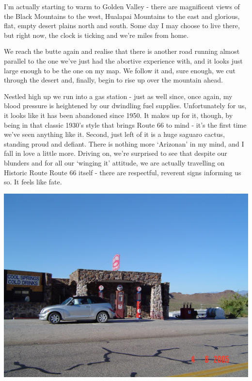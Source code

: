 \documentclass[a5paper,titlepage,11pt]{book}
\begin{document}
I'm actually starting to warm to Golden Valley - there are magnificent views of the Black Mountains to the west, Hualapai Mountains to the east and glorious, flat, empty desert plains north and south.  Some day I may choose to live there, but right now, the clock is ticking and we're miles from home.

We reach the butte again and realise that there is another road running almost parallel to the one we've just had the abortive experience with, and it looks just large enough to be the one on my map.  We follow it and, sure enough, we cut through the desert and, finally, begin to rise up over the mountain ahead.


Nestled high up we run into a gas station - just as well since, once again, my blood pressure is heightened by our dwindling fuel supplies.  Unfortunately for us, it looks like it has been abandoned since 1950.  It makes up for it, though, by being in that classic 1930's style that brings Route 66 to mind - it's the first time we've seen anything like it.  Second, just left of it is a huge saguaro cactus, standing proud and defiant.  There is nothing more `Arizonan' in my mind, and I fall in love a little more.  Driving on, we're surprised to see that despite our blunders and for all our `winging it' attitude, we are actually travelling on Historic Route Route 66 itself - there are respectful, reverent signs informing us so.  It feels like fate.

\begin{center}\includegraphics[width=\textwidth]{gfx/DSC00700}\end{center}
\end{document}
